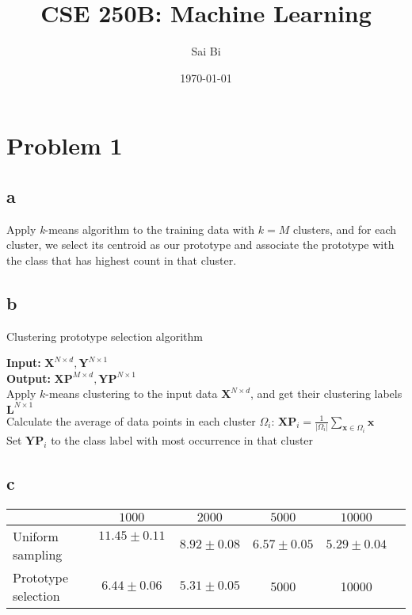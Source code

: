 \documentclass[a4paper,11pt]{article}
\theoremstyle{mytheor}
\begin{document}
\title{CSE 250B: Machine Learning}

\author{Sai Bi}

\date{\today}

\maketitle

\section*{Problem 1}
\subsection*{a} 
Apply \textit{k}-means algorithm to the training data with $k = M$ clusters, and for each cluster, we select its 
centroid as our prototype and associate the prototype with the class that has highest count in that cluster.

\subsection*{b}
{\LinesNumberedHidden
\begin{algorithm}[H]
	\DontPrintSemicolon
	\SetAlgoNoLine
	
	\caption{Clustering prototype selection algorithm}
	\textbf{Input: }{$\mathbf{X}^{N \times d}, \mathbf{Y}^{N \times 1}$} \\
	\textbf{Output: }{$\mathbf{XP}^{M \times d}, \mathbf{YP}^{N \times 1}$} \\
	Apply $k$-means clustering to the input data $\mathbf{X}^{N \times d}$, and get their clustering labels $\mathbf{L}^{N \times 1}$ \\
	Calculate the average of data points in each cluster $\Omega_i$: $\mathbf{XP}_i = \frac{1}{|\Omega_i|} \sum\limits_{\mathbf{x} \in \Omega_i}{\mathbf{x}}$ \\
	Set $\mathbf{YP}_i$ to the class label with most occurrence in that cluster
\end{algorithm}
}

\subsection*{c}
\begin{tabular}{|l|c|c|c|c|c|}
	\hline
		&  $1000$ & $2000$ & $5000$ & $10000$  \\ \hline
	Uniform sampling &  $11.45 \pm 0.11$ \ & $8.92 \pm 0.08 $ & $6.57 \pm 0.05 $ & $5.29 \pm 0.04$  \\ \hline 
	Prototype selection & $6.44 \pm 0.06$  & $5.31\pm 0.05$ & 5000 & 10000  \\ \hline 
\end{tabular}
\end{document}
